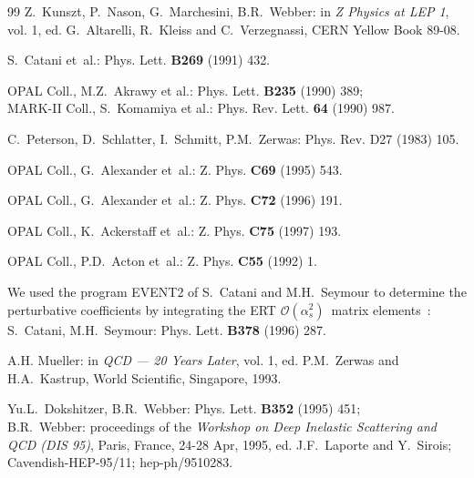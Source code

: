 \documentclass[12pt,a4paper,twoside]{article}
\newcommand{\oaa}    {\ensuremath{\mathcal{O}(\alpha_s^2)}}
\begin{document}
\begin{thebibliography}{99}
Z.~Kunszt, P.~Nason, G.~Marchesini, B.R.~Webber:
                                    in {\em Z Physics at LEP 1}, vol. 1,
                                    ed. G.~Altarelli, R.~Kleiss and C.~Verzegnassi,
                                    CERN Yellow Book 89-08.

S.~Catani et~al.:                   Phys. Lett. {\bf B269} (1991) 432.

OPAL Coll., M.Z.~Akrawy et al.:     Phys. Lett. {\bf B235} (1990) 389;\\
MARK-II Coll., S.~Komamiya et al.:  Phys. Rev. Lett. {\bf 64} (1990) 987.

C.~Peterson, D.~Schlatter, I.~Schmitt, P.M.~Zerwas:
                                    Phys. Rev. {D27} (1983) 105.

OPAL Coll., G.~Alexander et~al.:    Z. Phys. {\bf C69} (1995) 543.

OPAL Coll., G.~Alexander et~al.:    Z. Phys. {\bf C72} (1996) 191.

OPAL Coll., K.~Ackerstaff et~al.:   Z. Phys. {\bf C75} (1997) 193.

OPAL Coll., P.D.~Acton et~al.:       Z. Phys. {\bf C55} (1992) 1.

We used the program EVENT2 of S.~Catani and M.H.~Seymour to 
determine the perturbative coefficients by integrating the ERT \oaa\ 
matrix elements~\cite{bib-ERT}:\\
S.~Catani, M.H.~Seymour:            Phys. Lett. {\bf B378} (1996) 287.

A.H. Mueller:                       in {\em QCD --- 20 Years Later}, vol. 1,
                                    ed. P.M.~Zerwas and H.A.~Kastrup,
                                    World Scientific, Singapore, 1993.

Yu.L.~Dokshitzer, B.R.~Webber:      Phys. Lett. {\bf B352} (1995) 451;\\
B.R.~Webber:                        proceedings of the
                                    {\em Workshop on Deep Inelastic
                                         Scattering and QCD (DIS 95)},
                                    Paris, France, 24-28 Apr, 1995,
                                    ed. J.F.~Laporte and Y.~Sirois;
                                    Cavendish-HEP-95/11; hep-ph/9510283.


\end{thebibliography}
\end{document}
